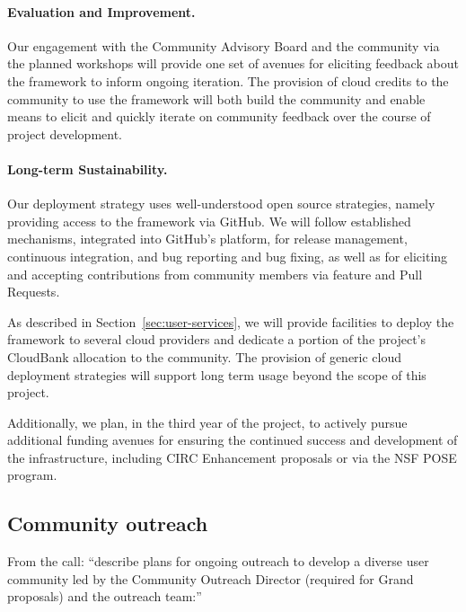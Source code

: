 \paragraph{Evaluation and Improvement.} Our engagement with the Community
Advisory Board and the community via the planned workshops will provide one set
of avenues for eliciting feedback about the framework to inform ongoing
iteration.    The provision of cloud credits to the community
to use the framework will both build the community and enable means to elicit
and quickly iterate on community feedback over the course of project
development. 

\paragraph{Long-term Sustainability.} Our deployment strategy uses
well-understood open source strategies, namely providing access to the framework
via GitHub.  We will follow established mechanisms, integrated into GitHub's
platform, for release management, continuous integration, and bug reporting and
bug fixing, as well as for eliciting and accepting contributions from community
members via feature and Pull Requests. 

As described in Section~\ref{sec:user-services}, we will provide facilities to
deploy the framework to several cloud providers and dedicate a portion of the
project's CloudBank allocation to the community.  The provision of generic cloud
deployment strategies will support long term usage beyond the scope of this
project.

Additionally, we plan, in the third year of the project, to actively pursue
additional funding avenues for ensuring the continued success and development of
the infrastructure, including CIRC Enhancement proposals or via the NSF POSE
program. 

\subsection{Community outreach}

From the call: ``describe plans for ongoing outreach to develop a diverse user
community led by the Community Outreach Director (required for Grand proposals)
and the outreach team:''


